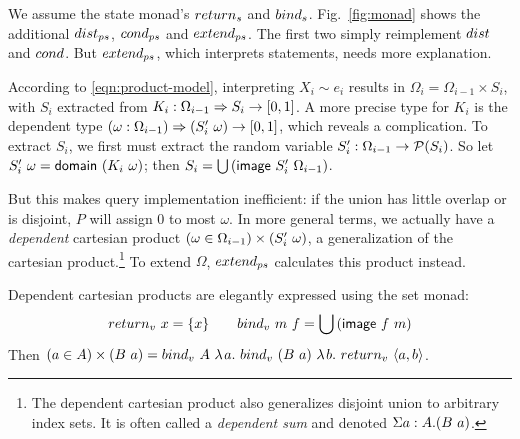 We assume the state monad's $return_s$ and $bind_s$. Fig.~\ref{fig:monad} shows the additional $dist_{ps}$, $cond_{ps}$ and $extend_{ps}$. The first two simply reimplement $dist$ and $cond$. But $extend_{ps}$, which interprets statements, needs more explanation.

\newcommand{\DependentSumNote}{The dependent cartesian product also generalizes disjoint union to arbitrary index sets. It is often called a \textit{dependent sum} and denoted $\Sigma a : A . {\papp B a}$.}

According to \eqref{eqn:product-model}, interpreting $X_i \sim e_i$ results in $\Omega_i = \Omega_{i-1} \times S_i$, with $S_i$ extracted from $K_i : \Omega_{i-1} \Rightarrow S_i \to [0,1]$. A more precise type for $K_i$ is the dependent type $(\omega : \Omega_{i-1}) \Rightarrow {\left({S_i'}\ {\omega}\right)} \to [0,1]$, which reveals a complication. To extract $S_i$, we first must extract the random variable $S_i' : \Omega_{i-1} \to \mathcal{P}(S_i)$. So let ${S_i'}\ {\omega} = {\mathsf{domain}}\ {\left({K_i}\ {\omega}\right)}$; then $S_i = \bigcup \left({\mathsf{image}}\ {S_i'}\ {\Omega_{i-1}}\right)$.

But this makes query implementation inefficient: if the union has little overlap or is disjoint, $P$ will assign $0$ to most $\omega$. In more general terms, we actually have a \textit{dependent} cartesian product $(\omega \in \Omega_{i-1}) \times \left({S_i'}\ {\omega}\right)$, a generalization of the cartesian product.\footnote{\DependentSumNote} To extend $\Omega$, $extend_{ps}$ calculates this product instead.

Dependent cartesian products are elegantly expressed using the set monad:
\begin{equation}
	{return_v}\ {x} = \{{x}\}
	\ \ \ \ \ \ {bind_v}\ {m}\ {f} = \bigcup \left({\mathsf{image}}\ {f}\ {m}\right)
\end{equation}
Then $(a \in A) \times \left({B}\ {a}\right)
		= {bind_v}\ {A}\ {\lambda\mspace{2mu}{a}\ldotp\, {{bind_v}\ {\left({B}\ {a}\right)}\ {\lambda\mspace{2mu}{b}\ldotp\, {{return_v}\ {\langle{a,b}\rangle}}}}}$.

